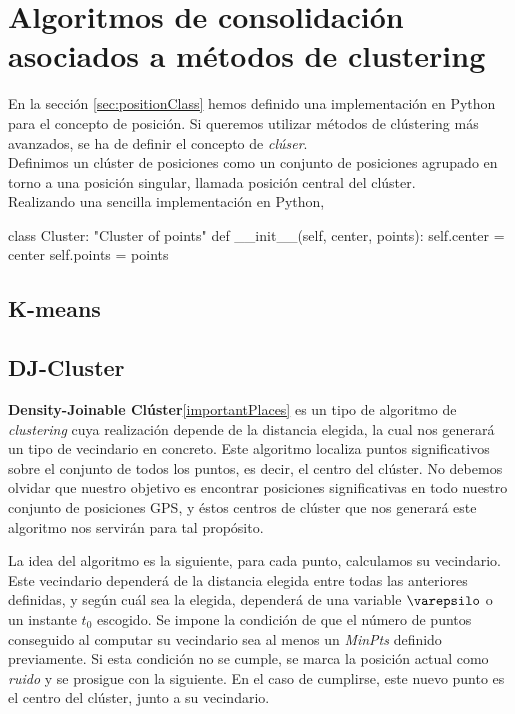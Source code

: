 \documentclass[a4paper, 12pt]{article}
\begin{document}
\pagebreak
\section{Algoritmos de consolidaci\'on asociados a m\'etodos de clustering}

En la secci\'on \ref{sec:positionClass} hemos definido una implementaci\'on en Python para el concepto de posici\'on. Si queremos utilizar m\'etodos de cl\'ustering m\'as avanzados, se ha de definir el concepto de \textit{cl\'user}. \\

Definimos un cl\'uster de posiciones como un conjunto de posiciones agrupado en torno a una posici\'on singular, llamada posici\'on central del cl\'uster.\\

Realizando una sencilla implementaci\'on en Python,


\begin{python}
class Cluster:
	"Cluster of points"
	def __init__(self, center, points):
    	self.center = center
		self.points = points
\end{python}


\pagebreak
\subsection{K-means}
\pagebreak
\subsection{DJ-Cluster}

\textbf{Density-Joinable Cl\'uster}\ref{importantPlaces} es un tipo de algoritmo de \textit{clustering} cuya realizaci\'on depende de la distancia elegida, la cual nos generar\'a un tipo de vecindario en concreto. Este algoritmo localiza puntos significativos sobre el conjunto de todos los puntos, es decir, el centro del cl\'uster. No debemos olvidar que nuestro objetivo es encontrar posiciones significativas en todo nuestro conjunto de posiciones GPS, y \'estos centros de cl\'uster que nos generar\'a este algoritmo nos servir\'an para tal prop\'osito. 

La idea del algoritmo es la siguiente, para cada punto, calculamos su vecindario. Este vecindario depender\'a de la distancia elegida entre todas las anteriores definidas, y seg\'un cu\'al sea la elegida, depender\'a de una variable $\varepsilo$ o un instante $t_0$ escogido. Se impone la condici\'on de que el n\'umero de puntos conseguido al computar su vecindario sea al menos un \textit{MinPts} definido previamente. Si esta condici\'on no se cumple, se marca la posici\'on actual como \textit{ruido} y se prosigue con la siguiente. En el caso de cumplirse, este nuevo punto es el centro del cl\'uster, junto a su vecindario. 
\end{document}
